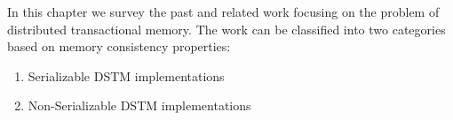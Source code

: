 \documentclass[12pt,english]{report}
\begin{document}
In this chapter we survey the past and related work focusing on the problem of distributed transactional memory. The work can be classified into two categories based on memory consistency properties:
%
\begin{enumerate}
\item Serializable DSTM implementations
\item Non-Serializable DSTM implementations 
\end{enumerate}
\end{document}
